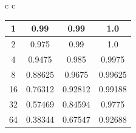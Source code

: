 \documentclass[11pt, journal]{IEEEtran}
\begin{document}
\begin{table}
\begin{tabular}{c c}
{\begin{tabular}{|c||c|c|c|}
            1 & 0.99 & 0.99 & 1.0 \\
            \hline
            2 & 0.975 & 0.99 & 1.0 \\
            \hline
            4 & 0.9475 & 0.985 & 0.9975 \\
            \hline
            8 & 0.88625 & 0.9675 & 0.99625 \\
            \hline
            16 & 0.76312 & 0.92812 & 0.99188 \\
            \hline
            32 & 0.57469 & 0.84594 & 0.9775 \\
            \hline
            64 & 0.38344 & 0.67547 & 0.92688 \\
            \hline
        \end{tabular}
    }
    \end{tabular}
\end{table}
\end{document}
